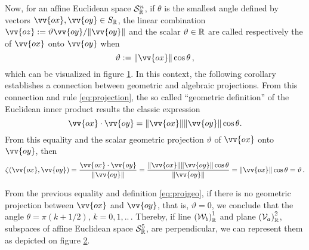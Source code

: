 Now, for an affine Euclidean space $\eamd{S}{R}{n}$, if $\theta$ is the smallest angle defined by vectors $\vv{ox},\vv{oy}\in S_\cam{R}$, the linear combination  $\vv{oz}:=\vartheta\vv{oy}/\|\vv{oy}\|$ and the scalar $\vartheta\in\real$ are called respectively the  of $\vv{ox}$ onto $\vv{oy}$ when
\begin{equation}\label{eq:projgeo}
\vartheta:=\|\vv{ox}\|\cos\theta\,,
\end{equation}
which can be visualized in figure \ref{fg:geoProject}. In this context, the following corollary establishes a connection between geometric and algebraic projections. From this connection and rule \eqref{eq:projection}, the so called ``geometric definition'' of the Euclidean inner product results the classic expression
\begin{equation}\label{eq:geoProdInt}
\vv{ox}\cdot\vv{oy}=\|\vv{ox}\|\|\vv{oy}\|\cos\theta.
\end{equation}
From this equality and the scalar geometric projection $\vartheta$ of $\vv{ox}$ onto $\vv{oy}$, then
\begin{equation}
\fua{\zeta}{\vv{ox},\vv{oy}}=\dfrac{\vv{ox}\cdot \vv{oy}}{\|\vv{oy}\|} = \dfrac{\|\vv{ox}\|\|\vv{oy}\|\cos\theta }{\|\vv{oy}\|}= \|\vv{ox}\|\cos\theta=\vartheta\,.
\end{equation}

\begin{figure}[!ht]
	\centering
	\begin{center}
		\scalebox{.72}{}
	\end{center}
	\label{fg:geoProject}
\end{figure}

From the previous equality and definition \eqref{eq:projgeo}, if there is no geometric projection between $\vv{ox}$ and $\vv{oy}$, that is, $\vartheta=0$, we conclude that the angle $\theta=\pi(k+1/2)$, $k=0,1,..\,$. Thereby, if line $\eamsd{W}{\real}{b}{1}$ and plane $\eamsd{V}{\real}{a}{2}$, subspaces of affine Euclidean space $\eamd{S}{\real}{5}$, are perpendicular, we can represent them as depicted on figure \ref{fg:perpend}.
\begin{figure}[!ht]
	\centering
	\begin{center}
		\scalebox{.72}{}
	\end{center}
	\label{fg:perpend}
\end{figure}


